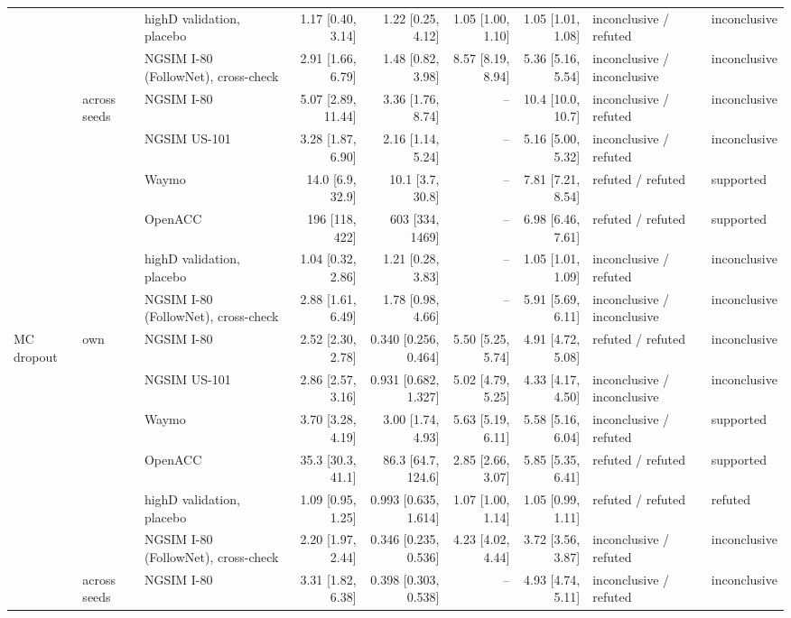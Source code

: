\begin{longtable}{lllrrrrll}
 &  & highD validation, placebo & 1.17 [0.40, 3.14] & 1.22 [0.25, 4.12] & 1.05 [1.00, 1.10] & 1.05 [1.01, 1.08] & inconclusive / refuted & inconclusive \\
 &  & NGSIM I-80 (FollowNet), cross-check & 2.91 [1.66, 6.79] & 1.48 [0.82, 3.98] & 8.57 [8.19, 8.94] & 5.36 [5.16, 5.54] & inconclusive / inconclusive & inconclusive \\
\midrule
 & across seeds & NGSIM I-80 & 5.07 [2.89, 11.44] & 3.36 [1.76, 8.74] & -- & 10.4 [10.0, 10.7] & inconclusive / refuted & inconclusive \\
 &  & NGSIM US-101 & 3.28 [1.87, 6.90] & 2.16 [1.14, 5.24] & -- & 5.16 [5.00, 5.32] & inconclusive / refuted & inconclusive \\
 &  & Waymo & 14.0 [6.9, 32.9] & 10.1 [3.7, 30.8] & -- & 7.81 [7.21, 8.54] & refuted / refuted & supported \\
 &  & OpenACC & 196 [118, 422] & 603 [334, 1469] & -- & 6.98 [6.46, 7.61] & refuted / refuted & supported \\
 &  & highD validation, placebo & 1.04 [0.32, 2.86] & 1.21 [0.28, 3.83] & -- & 1.05 [1.01, 1.09] & inconclusive / refuted & inconclusive \\
 &  & NGSIM I-80 (FollowNet), cross-check & 2.88 [1.61, 6.49] & 1.78 [0.98, 4.66] & -- & 5.91 [5.69, 6.11] & inconclusive / inconclusive & inconclusive \\
\midrule
MC dropout & own & NGSIM I-80 & 2.52 [2.30, 2.78] & 0.340 [0.256, 0.464] & 5.50 [5.25, 5.74] & 4.91 [4.72, 5.08] & refuted / refuted & inconclusive \\
 &  & NGSIM US-101 & 2.86 [2.57, 3.16] & 0.931 [0.682, 1.327] & 5.02 [4.79, 5.25] & 4.33 [4.17, 4.50] & inconclusive / inconclusive & inconclusive \\
 &  & Waymo & 3.70 [3.28, 4.19] & 3.00 [1.74, 4.93] & 5.63 [5.19, 6.11] & 5.58 [5.16, 6.04] & inconclusive / refuted & supported \\
 &  & OpenACC & 35.3 [30.3, 41.1] & 86.3 [64.7, 124.6] & 2.85 [2.66, 3.07] & 5.85 [5.35, 6.41] & refuted / refuted & supported \\
 &  & highD validation, placebo & 1.09 [0.95, 1.25] & 0.993 [0.635, 1.614] & 1.07 [1.00, 1.14] & 1.05 [0.99, 1.11] & refuted / refuted & refuted \\
 &  & NGSIM I-80 (FollowNet), cross-check & 2.20 [1.97, 2.44] & 0.346 [0.235, 0.536] & 4.23 [4.02, 4.44] & 3.72 [3.56, 3.87] & inconclusive / refuted & inconclusive \\
\midrule
 & across seeds & NGSIM I-80 & 3.31 [1.82, 6.38] & 0.398 [0.303, 0.538] & -- & 4.93 [4.74, 5.11] & inconclusive / refuted & inconclusive \\

\end{longtable}
